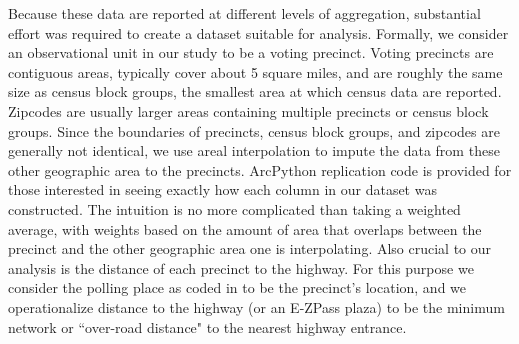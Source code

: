 Because these data are reported at different levels of aggregation, substantial effort was required to create a dataset suitable for analysis. Formally, we consider an observational unit in our study to be a voting precinct. Voting precincts are contiguous areas, typically cover about 5 square miles, and are roughly the same size as census block groups, the smallest area at which census data are reported. Zipcodes are usually larger areas containing multiple precincts or census block groups. Since the boundaries of precincts, census block groups, and zipcodes are generally not identical, we use areal interpolation to impute the data from these other geographic area to the precincts. ArcPython replication code is provided for those interested in seeing exactly how each column in our dataset was constructed. The intuition is no more complicated than taking a weighted average, with weights based on the amount of area that overlaps between the precinct and the other geographic area one is interpolating. Also crucial to our analysis is the distance of each precinct to the highway. For this purpose we consider the polling place as coded in \textcite{Ansolabehere2014} to be the precinct's location, and we operationalize distance to the highway (or an E-ZPass plaza) to be the minimum network or ``over-road distance" to the nearest highway entrance. 